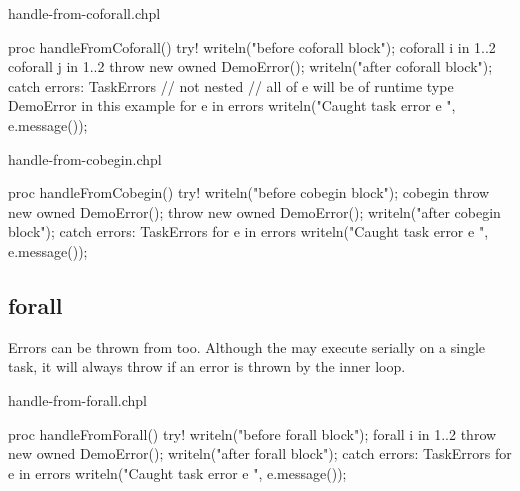\begin{chapelexample}{handle-from-coforall.chpl}
\begin{chapel}
proc handleFromCoforall() {
  try! {
    writeln("before coforall block");
    coforall i in 1..2 {
      coforall j in 1..2 {
        throw new owned DemoError();
      }
    }
    writeln("after coforall block");
  } catch errors: TaskErrors { // not nested
    // all of e will be of runtime type DemoError in this example
    for e in errors {
      writeln("Caught task error e ", e.message());
    }
  }
}
\end{chapel}
\begin{chapelpost}
\end{chapelpost}
\begin{chapeloutput}
\end{chapeloutput}
\end{chapelexample}

\begin{chapelexample}{handle-from-cobegin.chpl}
\begin{chapel}
proc handleFromCobegin() {
  try! {
    writeln("before cobegin block");
    cobegin {
      throw new owned DemoError();
      throw new owned DemoError();
    }
    writeln("after cobegin block");
  } catch errors: TaskErrors {
    for e in errors {
      writeln("Caught task error e ", e.message());
    }
  }
}
\end{chapel}
\begin{chapelpost}
\end{chapelpost}
\begin{chapeloutput}
\end{chapeloutput}
\end{chapelexample}

\subsection{forall}
\label{Errors_forall}

Errors can be thrown from  too. Although the  may execute
serially on a single task, it will always throw  if an error
is thrown by the inner loop.

\begin{chapelexample}{handle-from-forall.chpl}
\begin{chapel}
proc handleFromForall() {
  try! {
    writeln("before forall block");
    forall i in 1..2 {
      throw new owned DemoError();
    }
    writeln("after forall block");
  } catch errors: TaskErrors {
    for e in errors {
      writeln("Caught task error e ", e.message());
    }
  }
}
\end{chapel}
\begin{chapelpost}
\end{chapelpost}
\begin{chapeloutput}
\end{chapeloutput}
\end{chapelexample}

